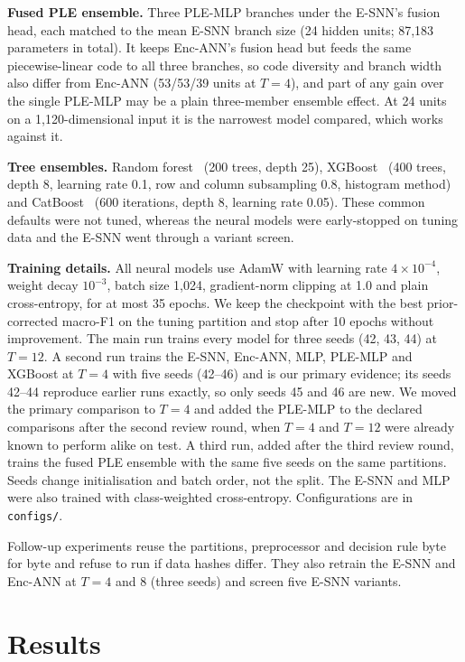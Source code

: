 \documentclass[conference]{IEEEtran}
\begin{document}
\textbf{Fused PLE ensemble.} Three PLE-MLP branches under the E-SNN's fusion head, each matched to the mean E-SNN branch size (24 hidden units; 87{,}183 parameters in total). It keeps Enc-ANN's fusion head but feeds the same piecewise-linear code to all three branches, so code diversity and branch width also differ from Enc-ANN (53/53/39 units at $T = 4$), and part of any gain over the single PLE-MLP may be a plain three-member ensemble effect. At 24 units on a 1{,}120-dimensional input it is the narrowest model compared, which works against it.

\textbf{Tree ensembles.} Random forest~\cite{breiman2001} (200 trees, depth 25), XGBoost~\cite{chen2016} (400 trees, depth 8, learning rate 0.1, row and column subsampling 0.8, histogram method) and CatBoost~\cite{prokhorenkova2018} (600 iterations, depth 8, learning rate 0.05). These common defaults were not tuned, whereas the neural models were early-stopped on tuning data and the E-SNN went through a variant screen.

\textbf{Training details.} All neural models use AdamW with learning rate $4\times10^{-4}$, weight decay $10^{-3}$, batch size 1{,}024, gradient-norm clipping at 1.0 and plain cross-entropy, for at most 35 epochs. We keep the checkpoint with the best prior-corrected macro-F1 on the tuning partition and stop after 10 epochs without improvement. The main run trains every model for three seeds (42, 43, 44) at $T = 12$. A second run trains the E-SNN, Enc-ANN, MLP, PLE-MLP and XGBoost at $T = 4$ with five seeds (42--46) and is our primary evidence; its seeds 42--44 reproduce earlier runs exactly, so only seeds 45 and 46 are new. We moved the primary comparison to $T = 4$ and added the PLE-MLP to the declared comparisons after the second review round, when $T = 4$ and $T = 12$ were already known to perform alike on test. A third run, added after the third review round, trains the fused PLE ensemble with the same five seeds on the same partitions. Seeds change initialisation and batch order, not the split. The E-SNN and MLP were also trained with class-weighted cross-entropy. Configurations are in \texttt{configs/}.

Follow-up experiments reuse the partitions, preprocessor and decision rule byte for byte and refuse to run if data hashes differ. They also retrain the E-SNN and Enc-ANN at $T = 4$ and 8 (three seeds) and screen five E-SNN variants.

\section{Results}
\label{sec:results}
\end{document}
